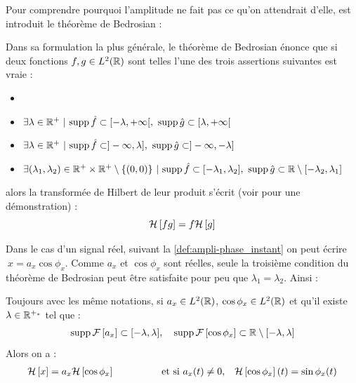 Pour comprendre pourquoi l'amplitude ne fait pas ce qu'on attendrait d'elle, est introduit le théorème de Bedrosian :

\begin{theoreme}[de Bedrosian]\label{theo:2Bedrosian}
	Dans sa formulation la plus générale, le théorème de Bedrosian énonce que si deux fonctions $f,g\in L^2(\mathbb{R})$ sont telles l'une des trois assertions suivantes est vraie :
	\begin{itemize}%
		\item 
		\item $\exists \lambda\in\mathbb{R}^+\ |\ \text{\normalfont supp}\, \hat{f} \subset [-\lambda, +\infty[,\ \text{\normalfont supp}\, \hat{g} \subset [\lambda, +\infty[$\label{item:1condi_theo2Bedrosian}
		
		\item $\exists \lambda\in\mathbb{R}^+\ |\ \text{\normalfont supp}\, \hat{f} \subset ]-\infty, \lambda],\ \text{\normalfont supp}\, \hat{g} \subset ]-\infty,-\lambda]$ \label{item:2condi_theo2Bedrosian}
		
		\item $\exists (\lambda_1,\lambda_2)\in \mathbb{R}^+\times\mathbb{R}^+ \setminus\{(0,0)\}\ |\ \text{\normalfont supp}\, \hat{f} \subset [-\lambda_1, \lambda_2],\ \text{\normalfont supp}\, \hat{g} \subset \mathbb{R}\setminus[-\lambda_2,\lambda_1]$
		
	\end{itemize}
	alors la transformée de Hilbert de leur produit s'écrit (voir \cite{wang_simple_2009} pour une démonstration) :
	\begin{equation}\label{eq:2Bedrosian}
		\mathcal{H}\left[fg\right] = f\mathcal{H}\left[g\right]
	\end{equation}
\end{theoreme}

Dans le cas d'un signal réel, suivant la \cref{def:ampli-phase_instant} on peut écrire $\ x=a_x\cos \phi_x$.
Comme $a_x$ et $\cos \phi_x$ sont réelles, seule la troisième condition du théorème de Bedrosian peut être satisfaite pour peu que $\lambda_1=\lambda_2$. Ainsi :

\begin{corollaire}\label{coro:AM-FM}
	Toujours avec les même notations, si $a_x\in L^2(\mathbb{R})$, $\cos\phi_x\in L^2(\mathbb{R})$ et qu'il existe $\lambda\in\mathbb{R}^{+_*}$ tel que :
	\begin{equation}\label{eq:condiBedro_AM-FM}
		\text{\normalfont supp}\, \mathcal{F}\left[a_x\right] \subset [-\lambda, \lambda],\quad \text{\normalfont supp}\, \mathcal{F}\left[\cos\phi_x\right] \subset \mathbb{R}\setminus[-\lambda,\lambda]
	\end{equation}
	Alors on a :
	\begin{align}\label{eq:result_AM-FM}
		\mathcal{H}\left[x\right] &= a_x\mathcal{H}\left[\cos \phi_x\right]  &  \qquad\qquad&\text{et si }a_x(t)\neq 0,  &  \mathcal{H}\left[\cos \phi_x\right](t) = \sin\phi_x(t)
	\end{align}
\end{corollaire}
\skipl

